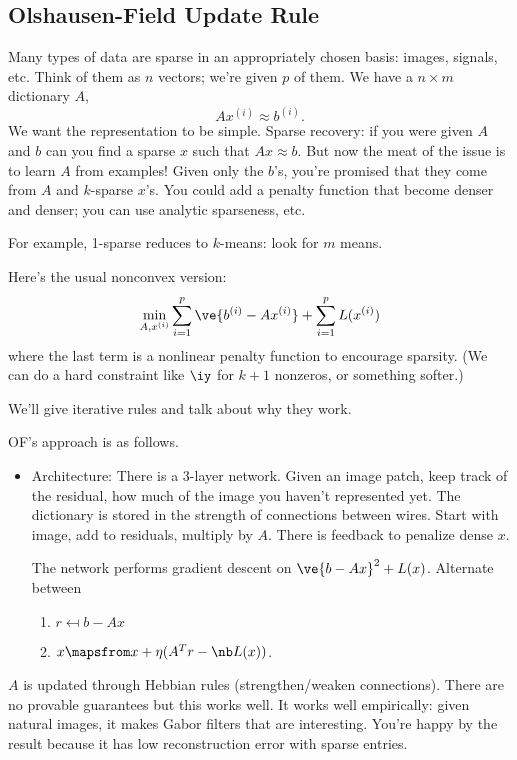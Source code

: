 \subsection{Olshausen-Field Update Rule}

Many types of data are sparse in an appropriately chosen basis: images, signals, etc. Think of them as $n$ vectors; we're given $p$ of them. We have a $n\times m$ dictionary $A$,
\[
Ax^{(i)} \approx b^{(i)}.
\]
We want the representation to be simple. Sparse recovery: if you were given $A$ and $b$ can you find a sparse $x$ such that $Ax\approx b$. 
But now the meat of the issue is to learn $A$ from examples! Given only the $b$'s, you're promised that they come from $A$ and $k$-sparse $x$'s. You could add a penalty function that become denser and denser; you can use analytic sparseness, etc.

For example, 1-sparse reduces to $k$-means: look for $m$ means.

Here's the usual nonconvex version:
\[
\min_{A,x^{(i)}}\sum_{i=1}^p \ve{b^{(i)}-Ax^{(i)}} + \sum_{i=1}^p L(x^{(i)})
\]
where the last term is a nonlinear penalty function to encourage sparsity. (We can do a hard constraint like $\iy$ for $k+1$ nonzeros, or something softer.)

We'll give iterative rules and talk about why they work.

OF's approach is as follows. 
\begin{itemize}
\item
Architecture: There is a 3-layer network. Given an image patch, keep track of the residual, how much of the image you haven't represented yet. The dictionary is stored in the strength of connections between wires. Start with image, add to residuals, multiply by $A$. There is feedback to penalize dense $x$. 

The network performs gradient descent on $\ve{b-Ax}^2 + L(x)$. Alternate between 
\begin{enumerate}
\item
$r\mapsfrom b-Ax$
\item
$x\mapsfrom x+\eta(A^T r -\nb L(x))$.
\end{enumerate}
\end{itemize}
$A$ is updated through Hebbian rules (strengthen/weaken connections). There are no provable guarantees but this works well.
It works well empirically: given natural images, it makes Gabor filters that are interesting. You're happy by the result because it has low reconstruction error with sparse entries.

